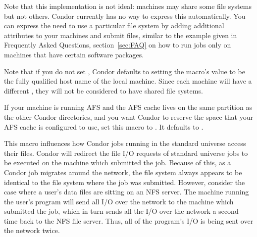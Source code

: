 \begin{description}

  Note that this implementation is not ideal: machines may share some
  file systems but not others. Condor currently has no way to express
  this automatically. You can express the need to use a
  particular file system by adding additional attributes to your machines
  and submit files, similar to the example given in 
  Frequently Asked Questions, 
  section~\ref{sec:FAQ} on
  how to run jobs only on machines that have 
  certain software packages.

  Note that if you do not set 
  , Condor defaults
  to setting the macro's value to be the fully qualified host name
  of the local machine.
  Since each machine will have a different
  ,
  they will not be considered to have shared file systems.

  
  
\label{param:ReserveAfsCache}
\item[\Macro{RESERVE\_AFS\_CACHE}]
  If your machine is running AFS and the AFS cache lives on the same
  partition as the other Condor directories, and you want Condor to
  reserve the space that your AFS cache is configured to use, set this
  macro to .  It defaults to .
  
\label{param:UseNfs}
\item[\Macro{USE\_NFS}]
  This macro influences
  how Condor jobs running in the standard universe access their
  files.  Condor will redirect the file I/O requests
  of standard universe jobs to be executed on the machine which
  submitted the job.  Because of this, as a Condor job migrates around
  the network, the file system always appears to be identical to the
  file system where the job was submitted.  However, consider the case
  where a user's data files are sitting on an NFS server. The machine
  running the user's program will send all I/O over the network to the
  machine which submitted the job, which in turn sends all the I/O
  over the network a second time back to the NFS file server. Thus,
  all of the program's I/O is being sent over the network twice.
  

\end{description}

